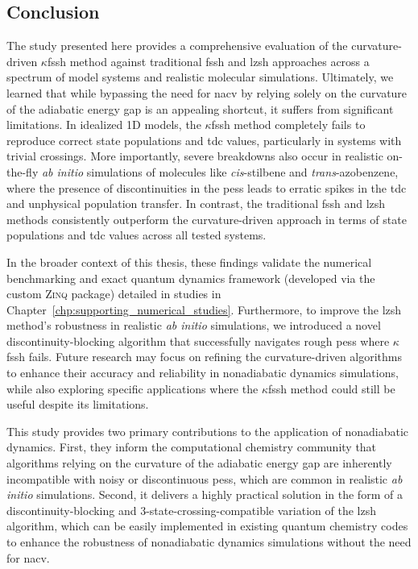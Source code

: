 \subsection{Conclusion}
The study presented here provides a comprehensive evaluation of the curvature-driven $\kappa$\gls{fssh} method against traditional \gls{fssh} and \gls{lzsh} approaches across a spectrum of model systems and realistic molecular simulations. Ultimately, we learned that while bypassing the need for \gls{nacv} by relying solely on the curvature of the adiabatic energy gap is an appealing shortcut, it suffers from significant limitations. In idealized 1D models, the $\kappa$\gls{fssh} method completely fails to reproduce correct state populations and \gls{tdc} values, particularly in systems with trivial crossings. More importantly, severe breakdowns also occur in realistic on-the-fly \textit{ab initio} simulations of molecules like \textit{cis}-stilbene and \textit{trans}-azobenzene, where the presence of discontinuities in the \glspl{pes} leads to erratic spikes in the \gls{tdc} and unphysical population transfer. In contrast, the traditional \gls{fssh} and \gls{lzsh} methods consistently outperform the curvature-driven approach in terms of state populations and \gls{tdc} values across all tested systems.

In the broader context of this thesis, these findings validate the numerical benchmarking and exact quantum dynamics framework (developed via the custom \textsc{Zinq} package) detailed in studies in Chapter~\ref{chp:supporting_numerical_studies}. Furthermore, to improve the \gls{lzsh} method's robustness in realistic \textit{ab initio} simulations, we introduced a novel discontinuity-blocking algorithm that successfully navigates rough \glspl{pes} where $\kappa$\gls{fssh} fails. Future research may focus on refining the curvature-driven algorithms to enhance their accuracy and reliability in nonadiabatic dynamics simulations, while also exploring specific applications where the $\kappa$\gls{fssh} method could still be useful despite its limitations.

This study provides two primary contributions to the application of nonadiabatic dynamics. First, they inform the computational chemistry community that algorithms relying on the curvature of the adiabatic energy gap are inherently incompatible with noisy or discontinuous \glspl{pes}, which are common in realistic \textit{ab initio} simulations. Second, it delivers a highly practical solution in the form of a discontinuity-blocking and 3-state-crossing-compatible variation of the \gls{lzsh} algorithm, which can be easily implemented in existing quantum chemistry codes to enhance the robustness of nonadiabatic dynamics simulations without the need for \gls{nacv}.
